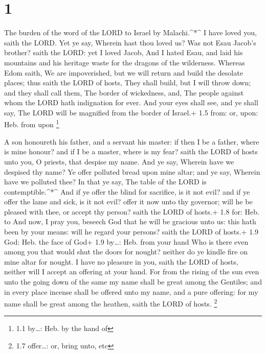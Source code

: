 \hypertarget{section}{%
\section{1}\label{section}}

 The burden of the word of the LORD to Israel by
Malachi.\^{}*\^{}  I have loved you, saith the LORD. Yet ye
say, Wherein hast thou loved us? Was not Esau Jacob's brother? saith the
LORD: yet I loved Jacob,  And I hated Esau, and laid his
mountains and his heritage waste for the dragons of the wilderness.
 Whereas Edom saith, We are impoverished, but we will return
and build the desolate places; thus saith the LORD of hosts, They shall
build, but I will throw down; and they shall call them, The border of
wickedness, and, The people against whom the LORD hath indignation for
ever.  And your eyes shall see, and ye shall say, The LORD
will be magnified from the border of Israel.+ 1.5 from: or, upon: Heb.
from upon \footnote{1.1 by\ldots: Heb. by the hand of}

 A son honoureth his father, and a servant his master: if
then I be a father, where is mine honour? and if I be a master, where is
my fear? saith the LORD of hosts unto you, O priests, that despise my
name. And ye say, Wherein have we despised thy name?  Ye
offer polluted bread upon mine altar; and ye say, Wherein have we
polluted thee? In that ye say, The table of the LORD is
contemptible.\^{}*\^{}  And if ye offer the blind for
sacrifice, is it not evil? and if ye offer the lame and sick, is it not
evil? offer it now unto thy governor; will he be pleased with thee, or
accept thy person? saith the LORD of hosts.+ 1.8 for: Heb. to
 And now, I pray you, beseech God that he will be gracious
unto us: this hath been by your means: will he regard your persons?
saith the LORD of hosts.+ 1.9 God: Heb. the face of God+ 1.9 by\ldots:
Heb. from your hand  Who is there even among you that would
shut the doors for nought? neither do ye kindle fire on mine altar for
nought. I have no pleasure in you, saith the LORD of hosts, neither will
I accept an offering at your hand.  For from the rising of
the sun even unto the going down of the same my name shall be great
among the Gentiles; and in every place incense shall be offered unto my
name, and a pure offering: for my name shall be great among the heathen,
saith the LORD of hosts. \footnote{1.7 offer\ldots: or, bring unto, etc}

